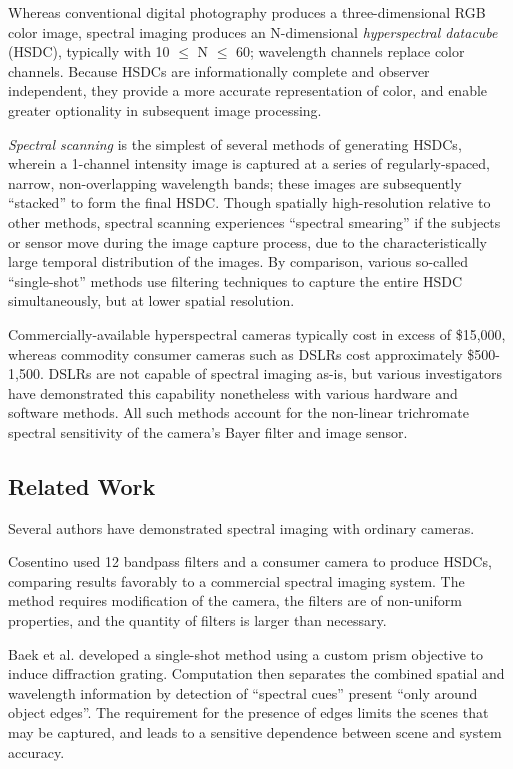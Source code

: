 \documentclass[twocolumn,10pt]{asme2ej}
\newcommand{\id}{\hspace{6 mm}}
\begin{document}

\id Whereas conventional digital photography produces a three-dimensional RGB color image, spectral imaging produces an N-dimensional \textit{hyperspectral datacube} (HSDC), typically with 10 $\leq$ N $\leq$ 60; wavelength channels replace color channels. Because HSDCs are informationally complete and observer independent, they provide a more accurate representation of color, and enable greater optionality in subsequent image processing.


\id \textit{Spectral scanning} is the simplest of several methods of generating HSDCs, wherein a 1-channel intensity image is captured at a series of regularly-spaced, narrow, non-overlapping wavelength bands; these images are subsequently ``stacked'' to form the final HSDC. Though spatially high-resolution relative to other methods, spectral scanning experiences ``spectral smearing'' if the subjects or sensor move during the image capture process, due to the characteristically large temporal distribution of the images. By comparison, various so-called ``single-shot'' methods use filtering techniques to capture the entire HSDC simultaneously, but at lower spatial resolution.


\id Commercially-available hyperspectral cameras typically cost in excess of \$15,000, whereas commodity consumer cameras such as DSLRs cost approximately \$500-1,500. DSLRs are not capable of spectral imaging as-is, but various investigators have demonstrated this capability nonetheless with various hardware and software methods. All such methods account for the non-linear trichromate spectral sensitivity of the camera's Bayer filter and image sensor.

\subsection{Related Work}

 Several authors have demonstrated spectral imaging with ordinary cameras.

\id Cosentino \cite{Cosentino} used 12 bandpass filters and a consumer camera to produce HSDCs, comparing results favorably to a commercial spectral imaging system. The method requires modification of the camera, the filters are of non-uniform properties, and the quantity of filters is larger than necessary.

\id Baek et al. \cite{Baek} developed a single-shot method using a custom prism objective to induce diffraction grating. Computation then separates the combined spatial and wavelength information by detection of ``spectral cues'' present ``only around object edges''. The requirement for the presence of edges limits the scenes that may be captured, and leads to a sensitive dependence between scene and system accuracy.
\end{document}
